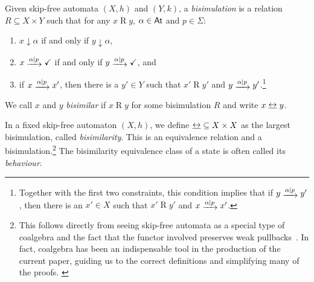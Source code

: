 \documentclass[orivec,envcountsect,envcountsame]{llncs}
\begin{document}
    \begin{definition}\label{def:g bisim}
        Given skip-free automata \((X, h)\) and \((Y, k)\), a \emph{bisimulation} is a relation \(R \subseteq X \times Y\) such that for any \(x \mathrel{R} y\), \(\alpha \in \mathsf{At}\) and \(p \in \Sigma\):
        \begin{enumerate}
            \item \(x \downarrow \alpha\) if and only if \(y \downarrow \alpha\),
            \item \(x \tr{\alpha \mid p} \checkmark\) if and only if \(y \tr{\alpha \mid p} \checkmark\), and
            \item if \(x \tr{\alpha \mid p} x'\), then there is a \(y' \in Y\) such that \(x'\mathrel{R} y'\) and \(y \tr{\alpha \mid p} y'\).\footnote{Together with the first two constraints, this condition implies that if $y \tr{\alpha \mid p} y'$, then there is an $x' \in X$ such that $x' \mathrel{R} y'$ and $x \tr{\alpha \mid p} x'$.}
        \end{enumerate}
        We call \(x\) and \(y\) \emph{bisimilar} if \(x \mathrel{R} y\) for some bisimulation $R$ and write
        $x \bisim y$.
    \end{definition}

    In a fixed skip-free automaton \((X, h)\), we define ${\bisim} \subseteq X\times X$ as the largest bisimulation, called \emph{bisimilarity}.
    This is an equivalence relation and a bisimulation.\footnote{
        This follows directly from seeing skip-free automata as a special type of coalgebra and the fact that the functor involved preserves weak pullbacks~\cite{coalgebra}.
        In fact, coalgebra has been an indispensable tool in the production of the current paper, guiding us to the correct definitions and simplifying many of the proofs.%
        \label{footnote:coalg}
   }
    The bisimilarity equivalence class of a state is often called its \emph{behaviour}.
\end{document}
